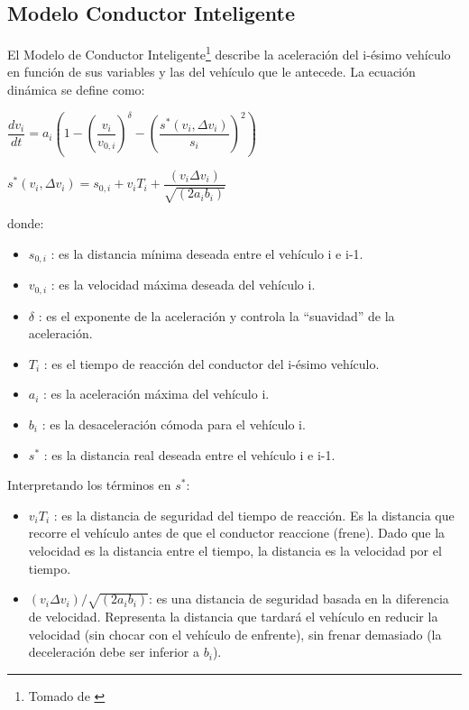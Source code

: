 \documentclass[colorinlistoftodos,twoside,twocolumn]{article} %
\begin{document}
	\subsection{Modelo Conductor Inteligente}
	
	El Modelo de Conductor Inteligente\footnote{Tomado de \cite{A1}} describe la aceleración del i-ésimo vehículo en función de sus variables y las del vehículo que le antecede. La ecuación dinámica se define como:
	
	\begin{center}
		$  \dfrac{dv_{i}}{dt} = a_{i} \left(1 - \left(\dfrac{v_{i}}{v_{0,i}}\right)^{\delta} - \left(\dfrac{s^{*}(v_{i}, \Delta v_{i})}{s_{i}}\right)^{2}\right)$
		
		\vspace{0.5em}
		$ s^{*}(v_{i}, \Delta v_{i}) =  s_{0,i} + v_{i}T_{i} + \dfrac{(v_{i} \Delta v_{i})}{\sqrt{(2a_{i} b_{i})}}$
	\end{center}
	donde:
	\begin{itemize}
		\item $ s_{0,i} $ : es la distancia mínima deseada entre el vehículo i e i-1.
		\item $ v_{0,i} $ : es la velocidad máxima deseada del vehículo i.
		\item $\delta$ : es el exponente de la aceleración y controla la “suavidad” de la aceleración.
		\item $ T_{i} $  : es el tiempo de reacción del conductor del i-ésimo vehículo.
		\item $ a_{i} $ : es la aceleración máxima del vehículo i.
		\item $ b_{i} $ : es la desaceleración cómoda para el vehículo i.
		\item $ s^{*} $ : es la distancia real deseada entre el vehículo i e i-1.
	\end{itemize}
	
	Interpretando los t\'erminos en $ s^{*} $:
	\begin{itemize}
		\item $ v_{i}T_{i}  $ : es la distancia de seguridad del tiempo de reacción. Es la distancia que recorre el vehículo antes de que el conductor reaccione (frene).
		Dado que la velocidad es la distancia entre el tiempo, la distancia es la velocidad por el tiempo.
		\item $ (v_{i} \Delta v_{i})/\sqrt{(2a_{i} b_{i})} $: es una distancia de seguridad basada en la diferencia de velocidad. Representa la distancia que tardará el vehículo en reducir la velocidad (sin chocar con el vehículo de enfrente), sin frenar demasiado (la deceleración debe ser inferior a $ b_{i} $).
	\end{itemize}
	
\end{document}
